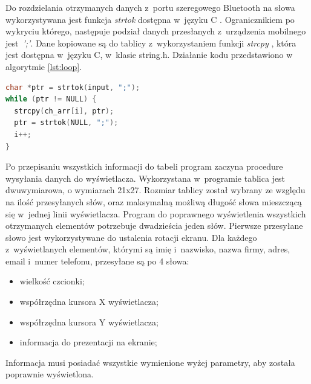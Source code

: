 \documentclass[a4paper,12pt, twoside]{article}
\begin{document}
    	Do rozdzielania otrzymanych danych z~portu szeregowego Bluetooth na słowa wykorzystywana jest funkcja \textit{strtok} dostępna w~języku C \cite{strtok}. \label{petladekod}Ogranicznikiem po wykryciu którego, następuje podział danych przesłanych z~urządzenia mobilnego jest~\textit{';'}. Dane kopiowane są do tablicy z~wykorzystaniem funkcji \textit{strcpy} \cite{strcpy}, która jest dostępna w~języku C, w~klasie string.h. Działanie kodu przedstawiono w algorytmie \ref{lst:loop}.
    \begin{lstlisting}[language=C++, label={lst:petlaprzepisujaca}, caption=Działanie pętli przepisującej otrzymane dane do tablicy, label={lst:loop}]
char *ptr = strtok(input, ";");
while (ptr != NULL) {
  strcpy(ch_arr[i], ptr);
  ptr = strtok(NULL, ";");
  i++;
}\end{lstlisting}
    
        Po przepisaniu wszystkich informacji do tabeli program zaczyna procedure wysyłania danych do wyświetlacza. Wykorzystana w~programie tablica jest dwuwymiarowa, o wymiarach 21x27. Rozmiar tablicy został wybrany ze względu na ilość przesyłanych słów,  oraz maksymalną możliwą długość słowa mieszczącą się w~jednej linii wyświetlacza. Program do poprawnego wyświetlenia wszystkich otrzymanych elementów potrzebuje dwadzieścia jeden słów. Pierwsze przesyłane słowo jest wykorzystywane do ustalenia rotacji ekranu. Dla każdego z~wyświetlanych elementów, którymi są imię i~nazwisko, nazwa firmy, adres, email i~numer telefonu, przesyłane są po 4 słowa:
        \begin{itemize}
            \item wielkość czcionki;
            \item współrzędna kursora X wyświetlacza;
            \item współrzędna kursora Y wyświetlacza;
            \item informacja do prezentacji na ekranie;
        \end{itemize}
    
    	Informacja musi posiadać wszystkie wymienione wyżej parametry, aby została poprawnie wyświetlona.
    	
\end{document}
